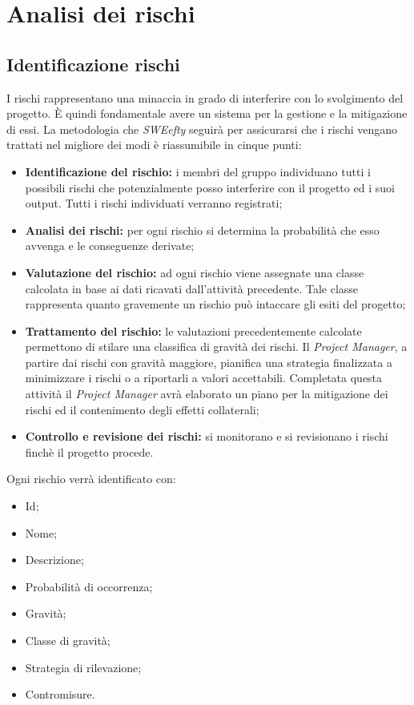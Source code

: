 \section{Analisi dei rischi}
\subsection{Identificazione rischi}
I rischi rappresentano una minaccia in grado di interferire con lo svolgimento del progetto. È quindi fondamentale avere un sistema per la gestione e la mitigazione di essi.
La metodologia che \textit{SWEefty} seguirà per assicurarsi che i rischi vengano trattati nel migliore dei modi è riassumibile in cinque punti:
\begin{itemize}
	\item \textbf{Identificazione del rischio:} i membri del gruppo individuano tutti i possibili rischi che potenzialmente posso interferire con il progetto ed i suoi output. Tutti i rischi individuati verranno registrati;
	
	\item \textbf{Analisi dei rischi:} per ogni rischio si determina la probabilità che esso avvenga e le conseguenze derivate;
	
	\item \textbf{Valutazione del rischio:} ad ogni rischio viene assegnate una classe calcolata in base ai dati ricavati dall'attività precedente. Tale classe rappresenta quanto gravemente un rischio può intaccare gli esiti del progetto;
	
	\item \textbf{Trattamento del rischio:} le valutazioni precedentemente calcolate permettono di stilare una classifica di gravità dei rischi. Il \emph{Project Manager}, a partire dai rischi con gravità maggiore, pianifica una strategia finalizzata a minimizzare i rischi o a riportarli a valori accettabili. Completata questa attività il \emph{Project Manager} avrà elaborato un piano per la mitigazione dei rischi ed il contenimento degli effetti collaterali;
	
	\item \textbf{Controllo e revisione dei rischi:} si monitorano e si revisionano i rischi finchè il progetto procede.
\end{itemize}

Ogni rischio verrà identificato con:
\begin{itemize}
	\item Id;
	\item Nome;
	\item Descrizione;
	\item Probabilità di occorrenza;
	\item Gravità;
	\item Classe di gravità;
	\item Strategia di rilevazione;
	\item Contromisure.
\end{itemize}

